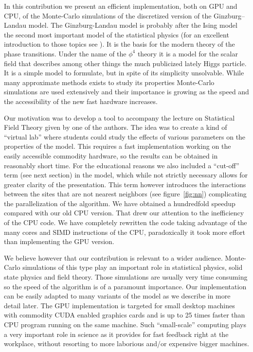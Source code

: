 \documentclass[a4paper]{llncs}
\begin{document}
In this contribution we present an efficient implementation, both on GPU and
CPU, of the Monte-Carlo simulations of the discretized version of the
Ginzburg--Landau model. The Ginzburg-Landau model is probably after the Ising
model the second most important model of the statistical physics (for an
excellent introduction to those topics see \cite{binney}). It is the basis for
the modern theory of the phase transitions. Under the name of the $\phi^4$
theory it is a model for the scalar field that describes among other things the
much publicized lately Higgs particle. It is a simple model to formulate, but
in spite of its simplicity unsolvable. While many approximate methods exists to
study its properties Monte-Carlo simulations are used extensively and their
importance is growing as the speed and the accessibility of the new fast
hardware increases.

Our motivation was to develop a tool to accompany the lecture on Statistical
Field Theory given by one of the authors. The idea was to create a kind of
``virtual lab'' where students could study the effects of various parameters on
the properties of the model. This requires a fast implementation working on the
easily accessible commodity hardware, so the results can be obtained in
reasonably short time. For the educational reasons we also included a
``cut-off'' term (see next section) in the model, which while not strictly
necessary allows for greater clarity of the presentation. This term however
introduces the interactions between the sites that are not nearest neighbors
(see figure~\ref{fig:nn}) complicating the parallelization of the algorithm. We
have obtained a hundredfold speedup compared with our old CPU version. That
drew our attention to the inefficiency of the CPU code. We have completely
rewritten the code taking advantage of the many cores and SIMD instructions of
the CPU, paradoxically it took more effort than implementing the GPU version.

We believe however that our contribution is relevant to a wider audience.
Monte-Carlo simulations of this type play an important role in statistical
physics, solid state physics and field theory. Those simulations are usually
very time consuming so the speed of the algorithm is of a paramount importance.
Our implementation can be easily adapted to many variants of the model as we
describe in more detail later. The GPU implementation is targeted for small
desktop machines with commodity CUDA enabled graphics cards and is up to 25
times faster than CPU program running on the same machine. Such ``small-scale''
computing plays a very important role in science as it provides for fast
feedback right at the workplace, without resorting to more laborious and/or
expensive bigger machines.
\end{document}
